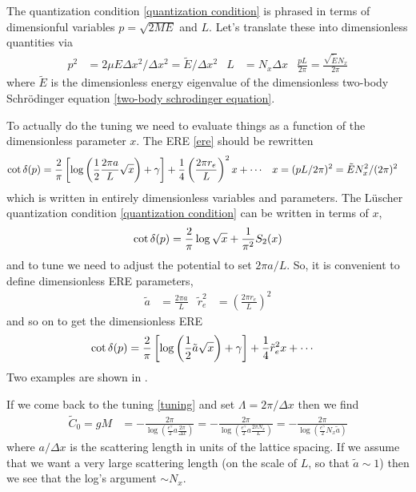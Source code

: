 The quantization condition \eqref{quantization condition} is phrased in terms of dimensionful variables $p=\sqrt{2ME}$ and $L$.
Let's translate these into dimensionless quantities via
\begin{align}
    p^2 &= 2 \mu  E \Delta x^2 / \Delta x^2 = \tilde{E} / \Delta x^2
	&
	L &= N_x \Delta x
    &
    \frac{pL}{2\pi} = \frac{\sqrt{\tilde{E}} N_x}{2\pi}
\end{align}
where $\tilde{E}$ is the dimensionless energy eigenvalue of the dimensionless two-body Schr\"{o}dinger equation \eqref{two-body schrodinger equation}.

To actually do the tuning we need to evaluate things as a function of the dimensionless parameter $x$.
The ERE \eqref{ere} should be rewritten
\begin{align}
    \cot \delta(p)
    &=
    \frac{2}{\pi}\left[ \log\left(\frac{1}{2} \frac{2\pi a}{L} \sqrt{x}\right)+ \gamma\right]
    +
    \frac{1}{4} \left(\frac{2\pi r_e }{L}\right)^2 x
    +
    \cdots
	&
	x&=(pL/2\pi)^2=\tilde{E}N_x^2 / (2\pi)^2
    \label{eq:ere dimensionless}
\end{align}
which is written in entirely dimensionless variables and parameters.
The L\"{u}scher quantization condition \eqref{quantization condition} can be written in terms of $x$,
\begin{align}
    \cot \delta(p) = \frac{2}{\pi} \log \sqrt{x} + \frac{1}{\pi^2} S_2(x)
	\label{eq:quantization condition dimensionless}
\end{align}
and to tune we need to adjust the potential to set $2\pi a/L$.
So, it is convenient to define dimensionless ERE parameters,
\begin{align}
    \tilde{a} &= \frac{2 \pi a}{L}
    &
    \tilde{r}_e^2 &= \left(\frac{2 \pi r_e}{L}\right)^2
	\label{eq:dimensionless ere parameters}
\end{align}
and so on to get the dimensionless ERE
\begin{align}
    \cot \delta(p)
    &=
	\frac{2}{\pi}\left[ \log\left(\frac{1}{2} \tilde{a} \sqrt{x}\right)+ \gamma\right]
    +
	\frac{1}{4} \tilde{r}_e^2 x
    +
    \cdots
    \label{eq:ere dimensionless}
\end{align}
Two examples are shown in .

If we come back to the tuning \eqref{tuning} and set $\Lambda=2\pi/\Delta x$ then we find
\begin{align}
	\tilde{C}_0 = gM
	&= - \frac{2\pi}{\log\left(\frac{e^\gamma}{2} a \frac{2\pi}{\Delta x}\right)}
	= - \frac{2\pi}{\log\left(\frac{e^\gamma}{2} a \frac{2\pi N_x}{L}\right)}
	= - \frac{2\pi}{\log\left(\frac{e^\gamma}{2} N_x \tilde{a} \right)}
	\label{eq:coupling analytically}
\end{align}
where $a/\Delta x$ is the scattering length in units of the lattice spacing.
If we assume that we want a very large scattering length (on the scale of $L$, so that $\tilde{a} \sim 1$) then we see that the log's argument $\sim N_x$.

